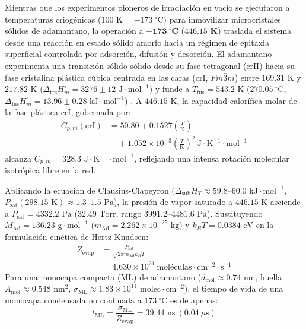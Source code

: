 \documentclass[10pt,twocolumn,a4paper]{article}
\begin{document}
Mientras que los experimentos pioneros de irradiación en vacío se ejecutaron a temperaturas criogénicas ($100\text{ K} = -173\ ^\circ\text{C}$) \cite{Fu2025} para inmovilizar microcristales sólidos de adamantano, la operación a $\mathbf{+173\ ^\circ\text{C}}$ ($\mathbf{446.15\text{ K}}$) traslada el sistema desde una reacción en estado sólido amorfo hacia un régimen de epitaxia superficial controlada por adsorción, difusión y desorción. El adamantano experimenta una transición sólido-sólido desde su fase tetragonal ($\text{crII}$) hacia su fase cristalina plástica cúbica centrada en las caras ($\text{crI}$, $Fm\bar{3}m$) entre $169.31\text{ K}$ y $217.82\text{ K}$ ($\Delta_{\text{trs}}H^\circ_m = 3276 \pm 12\text{ J}\cdot\text{mol}^{-1}$) y funde a $T_{\text{fus}} = 543.2\text{ K}$ ($270.05\ ^\circ\text{C}$, $\Delta_{\text{fus}}H^\circ_m = 13.96 \pm 0.28\text{ kJ}\cdot\text{mol}^{-1}$) \cite{Bazyleva2011}. A $446.15\text{ K}$, la capacidad calorífica molar de la fase plástica $\text{crI}$, gobernada por:
\begin{equation}
\begin{split}
C_{p,m}(\text{crI}) &= 50.80 + 0.1527\left(\frac{T}{\text{K}}\right) \\
&\quad + 1.052 \times 10^{-3}\left(\frac{T}{\text{K}}\right)^2\ \text{J}\cdot\text{K}^{-1}\cdot\text{mol}^{-1}
\end{split}
\end{equation}
alcanza $C_{p,m} = 328.3\text{ J}\cdot\text{K}^{-1}\cdot\text{mol}^{-1}$, reflejando una intensa rotación molecular isotrópica libre en la red.

Aplicando la ecuación de Clausius-Clapeyron ($\Delta_{\text{sub}}H_T \approx 59.8\text{--}60.0\text{ kJ}\cdot\text{mol}^{-1}$, $P_{\text{sat}}(298.15\text{ K}) \approx 1.3\text{--}1.5\text{ Pa}$), la presión de vapor saturado a $446.15\text{ K}$ asciende a $P_{\text{sat}} = 4332.2\text{ Pa}$ ($32.49\text{ Torr}$, rango $3991.2\text{--}4481.6\text{ Pa}$). Sustituyendo $M_{\text{Ad}} = 136.23\text{ g}\cdot\text{mol}^{-1}$ ($m_{\text{Ad}} = 2.262 \times 10^{-25}\text{ kg}$) y $k_B T = 0.0384\text{ eV}$ en la formulación cinética de Hertz-Knudsen:
\begin{equation}
\begin{split}
Z_{\text{evap}} &= \frac{P_{\text{sat}}}{\sqrt{2\pi m_{\text{Ad}} k_B T}} \\
&= 4.630 \times 10^{21}\ \text{moléculas}\cdot\text{cm}^{-2}\cdot\text{s}^{-1}
\end{split}
\end{equation}
Para una monocapa compacta (ML) de adamantano ($d_{\text{mol}} \approx 0.74\text{ nm}$, huella $A_{\text{mol}} \approx 0.548\text{ nm}^2$, $\sigma_{\text{ML}} \approx 1.83 \times 10^{14}\text{ molec}\cdot\text{cm}^{-2}$), el tiempo de vida de una monocapa condensada no confinada a $173\ ^\circ\text{C}$ es de apenas:
\begin{equation}
t_{\text{ML}} = \frac{\sigma_{\text{ML}}}{Z_{\text{evap}}} = 39.44\text{ ns}\ (0.04\ \mu\text{s})
\end{equation}
\end{document}
